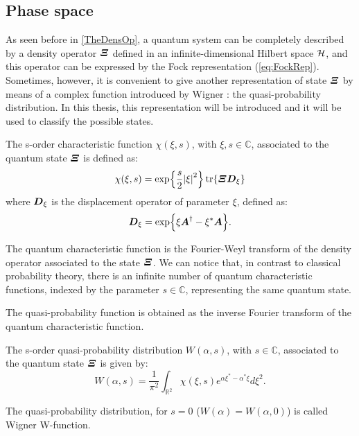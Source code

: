     \subsection{Phase space}
        As seen before in \ref{TheDensOp}, a quantum system can be completely
        described by a density operator $\bm{\relax{\varXi}}$ defined in an infinite-dimensional Hilbert space
        $\mathcal{H}$, and this operator can be expressed by the Fock representation (\ref{eq:FockRep}).
        Sometimes, however, it is convenient to give another representation of state $\bm{\relax{\varXi}}$ by
        means of a complex function introduced by Wigner \cite{Wigner}: the quasi-probability 
        distribution. In this thesis, this representation will be introduced and it will be used to
        classify the possible states.

        \begin{definition}
            The s-order characteristic function $\mathcal{\chi}(\xi,s)$, with $\xi,s\in\mathbb{C}$,
            associated to the quantum state $\bm{\relax{\varXi}}$ is defined as:
            \begin{equation}
                \mathcal{\chi}(\xi,s)=\exp{\frac{s}{2}\absolutevalue{\xi}^2}
                \tr{\Operator{\varXi}\Operator{D}_\xi}
            \end{equation}
            where $\bm{\relax{D}}_\xi$ is  the displacement operator of parameter $\xi$, defined as:
            \begin{equation}
                \bm{\relax{D}}_\xi=\exp{\xi\bm{\relax{A}}^\dagger-\xi^*\bm{\relax{A}}}.
            \end{equation}
        \end{definition}
        The quantum characteristic function is the Fourier-Weyl transform of the density operator 
        associated to the state $\bm{\relax{\varXi}}$. We can notice that, in contrast to classical 
        probability theory, there is an infinite number of quantum characteristic functions, 
        indexed by the parameter $s \in \mathbb{C}$, representing the same quantum state.

        The quasi-probability function is obtained as the inverse Fourier transform of the 
        quantum characteristic function.
        \begin{definition}
            The s-order quasi-probability distribution $W(\alpha,s)$, with $s\in\mathbb{C}$,
            associated to the quantum state $\bm{\relax{\varXi}}$ is given by:
            \begin{equation*}
                W(\alpha,s)=\frac{1}{\pi^2}\int_{\mathbb{R}^2} 
                \mathcal{\chi}(\xi,s)e^{\alpha\xi^*-\alpha^*\xi}d\xi^2.
            \end{equation*}

        \end{definition}
        The quasi-probability distribution, for $s=0$ ($W(\alpha)=W(\alpha,0)$) is called 
        Wigner W-function.